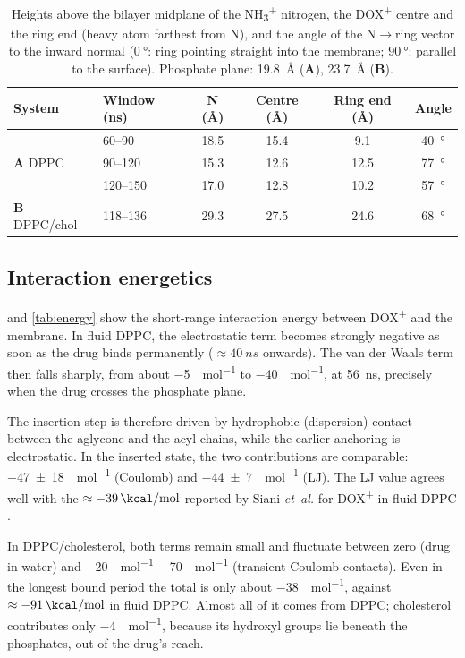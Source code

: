 \documentclass[11pt,a4paper]{article}
\newcommand{\dox}{DOX\textsuperscript{+}}
\newcommand{\nhthree}{NH\textsubscript{3}\textsuperscript{+}}
\newcommand{\sysA}{\textcolor{sysA}{\textbf{A}}}
\newcommand{\sysB}{\textcolor{sysB}{\textbf{B}}}
\begin{document}
\begin{table}[!htbp]
\centering
\caption[Orientation of \dox]{Heights above the bilayer midplane of the \nhthree{} nitrogen, the \dox{}
centre and the ring end (heavy atom farthest from N), and the angle of the N$\to$ring vector to the inward
normal ($\SI{0}{\degree}$: ring pointing straight into the membrane; $\SI{90}{\degree}$: parallel to the
surface). Phosphate plane: \SI{19.8}{\angstrom} (\sysA), \SI{23.7}{\angstrom} (\sysB).}
\label{tab:orient}
\begin{tabular}{@{}llcccc@{}}
\toprule
System & Window (ns) & N (\si{\angstrom}) & Centre (\si{\angstrom}) & Ring end (\si{\angstrom}) & Angle \\
\midrule
\multirow{3}{*}{\sysA{} DPPC} & 60--90   & 18.5 & 15.4 & 9.1  & \SI{40}{\degree} \\
                              & 90--120  & 15.3 & 12.6 & 12.5 & \SI{77}{\degree} \\
                              & 120--150 & 17.0 & 12.8 & 10.2 & \SI{57}{\degree} \\
\midrule
\sysB{} DPPC/chol             & 118--136 & 29.3 & 27.5 & 24.6 & \SI{68}{\degree} \\
\bottomrule
\end{tabular}
\end{table}

\subsection{Interaction energetics}
 and \cref{tab:energy} show the short-range interaction energy between \dox{} and
the membrane. In fluid DPPC, the electrostatic term becomes strongly negative as soon as the drug binds
permanently ($\approx\SI{40}{ns}$ onwards). The van der Waals term then falls sharply, from about
\SI{-5}{\kcal\per\mol} to \SI{-40}{\kcal\per\mol}, at \SI{56}{\ns}, precisely when the drug crosses the
phosphate plane.

The insertion step is therefore driven by hydrophobic (dispersion) contact between the aglycone and the
acyl chains, while the earlier anchoring is electrostatic. In the inserted state, the two contributions
are comparable: \SI{-47 \pm 18}{\kcal\per\mol} (Coulomb) and \SI{-44 \pm 7}{\kcal\per\mol} (LJ). The
LJ value agrees well with the $\approx\SI{-39}{\kcal\per\mol}$ reported by Siani \emph{et~al.} for
\dox{} in fluid DPPC \cite{siani2021}.

In DPPC/cholesterol, both terms remain small and fluctuate between zero (drug in water) and
\SIrange{-20}{-70}{\kcal\per\mol} (transient Coulomb contacts). Even in the longest bound period the
total is only about \SI{-38}{\kcal\per\mol}, against $\approx\SI{-91}{\kcal\per\mol}$ in fluid DPPC.
Almost all of it comes from DPPC; cholesterol contributes only \SI{-4}{\kcal\per\mol}, because its
hydroxyl groups lie beneath the phosphates, out of the drug's reach.
\end{document}
